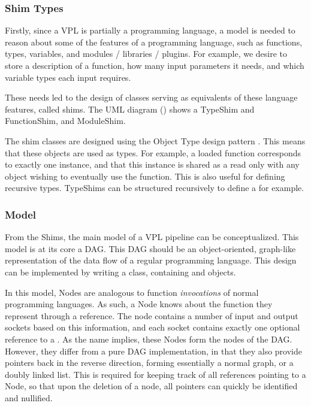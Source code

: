 \subsubsection*{Shim Types}

Firstly, since a VPL is partially a programming language, a model is needed to reason about some of the features of a programming language, such as functions, types, variables, and modules / libraries / plugins.
For example, we desire to store a description of a function, how many input parameters it needs, and which variable types each input requires. 

These needs led to the design of classes serving as equivalents of these language features, called shims. 
The UML diagram () shows a TypeShim and FunctionShim, and ModuleShim. 

The shim classes are designed using the Object Type design pattern \citep{gamma_design_1994}. 
This means that these objects are used as types. 
For example, a loaded function corresponds to exactly one  instance, and that this instance is shared as a read only with any object wishing to eventually use the function. 
This is also useful for defining recursive types. 
TypeShims can be structured recursively to define a  for example. 



\subsubsection*{Model}
\label{sec:method-model}


From the Shims, the main model of a VPL pipeline can be conceptualized. 
This model is at its core a \ac{DAG}. 
This \ac{DAG} should be an object-oriented, graph-like representation of the data flow of a regular programming language. 
This design can be implemented by writing a  class, containing  and  objects. 

In this model, Nodes are analogous to function \emph{invocations} of normal programming languages. 
As such, a Node knows about the function they represent through a  reference. 
The node contains a number of input and output sockets based on this information, and each socket contains exactly one optional reference to a .  
As the name implies, these Nodes form the nodes of the DAG. 
However, they differ from a pure DAG implementation, in that they also provide pointers back in the reverse direction, forming essentially a normal graph, or a doubly linked list. 
This is required for keeping track of all references pointing to a Node, so that upon the deletion of a node, all pointers can quickly be identified and nullified.

